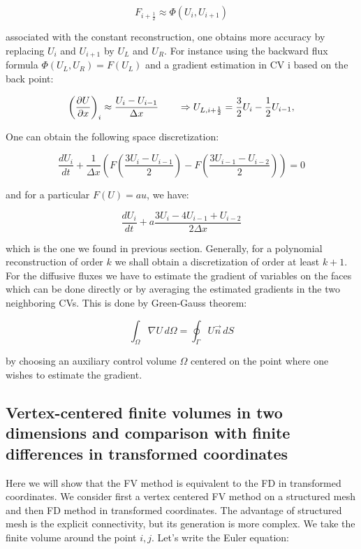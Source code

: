 \begin{equation}
F_{i+\frac{1}{2}} \approx \Phi (U_i , U_{i+1})
\end{equation}

associated with the constant reconstruction, one obtains more accuracy by replacing $U_i$ and $U_{i+1}$ by $U_L$ and $U_R$. For instance using the backward flux formula $\Phi (U_L,U_R) = F(U_L)$ and a gradient estimation in CV i based on the back point:

\begin{equation}
\left(\frac{\partial U}{\partial x} \right)_i \approx \frac{U_i - U_{i-1}}{\Delta x} \qquad \Rightarrow U_{L, i+\frac{1}{2}} = \frac{3}{2} U_i -\frac{1}{2}U_{i-1},
\end{equation}

One can obtain the following space discretization: 

\begin{equation}
\frac{dU_i}{dt} + \frac{1}{\Delta x} \left( F\left(\frac{3U_i - U_{i-1}}{2} \right) - F\left(\frac{3U_{i-1} - U_{i-2}}{2} \right) \right) = 0
\end{equation}

and for a particular $F(U) = au$, we have: 

\begin{equation}
\frac{dU_i}{dt} + a \frac{3U_i - 4U_{i-1}+U_{i-2}}{2\Delta x}
\end{equation}

which is the one we found in previous section. Generally, for a polynomial reconstruction of order $k$ we shall obtain a discretization of order at least $k+1$. For the diffusive fluxes we have to estimate the gradient of variables on the faces which can be done directly or by averaging the estimated gradients in the two neighboring CVs. This is done by Green-Gauss theorem: 

\begin{equation}
\int _\Omega \nabla U \, d\Omega = \oint _\Gamma U\vec{n}\, dS
\end{equation}

by choosing an auxiliary control volume $\Omega$ centered on the point where one wishes to estimate the gradient. 

\subsection{Vertex-centered finite volumes in two dimensions and comparison with finite differences in transformed coordinates}
Here we will show that the FV method is equivalent to the FD in transformed coordinates. We consider first a vertex centered FV method on a structured mesh and then FD method in transformed coordinates. The advantage of structured mesh is the explicit connectivity, but its generation is more complex. We take the finite volume around the point $i, j$. Let's write the Euler equation: 

